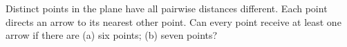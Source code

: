 Distinct points in the plane have all pairwise distances different. Each point directs an arrow to its nearest other point. Can every point receive at least one arrow if there are (a) six points; (b) seven points?
